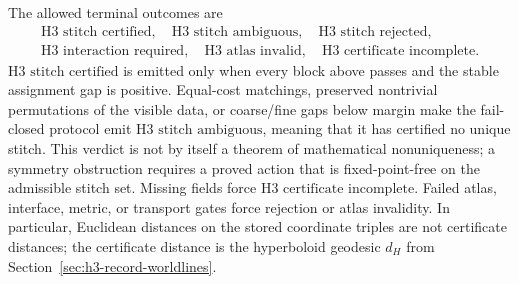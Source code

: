 The allowed terminal outcomes are
\[
\begin{gathered}
\text{H3 stitch certified},\quad
\text{H3 stitch ambiguous},\quad
\text{H3 stitch rejected},\\
\text{H3 interaction required},\quad
\text{H3 atlas invalid},\quad
\text{H3 certificate incomplete}.
\end{gathered}
\]
\(\text{H3 stitch certified}\) is emitted only when every block above passes and the stable
assignment gap is positive. Equal-cost matchings, preserved nontrivial permutations of the visible
data, or coarse/fine gaps below margin make the fail-closed protocol emit
\(\text{H3 stitch ambiguous}\), meaning that it has certified no unique
stitch. This verdict is not by itself a theorem of mathematical nonuniqueness;
a symmetry obstruction requires a proved action that is fixed-point-free on
the admissible stitch set. Missing fields
force \(\text{H3 certificate incomplete}\). Failed atlas, interface, metric, or transport gates
force rejection or atlas invalidity. In particular, Euclidean distances on
the stored coordinate triples are not certificate distances; the certificate distance is
the hyperboloid geodesic \(d_H\) from Section~\ref{sec:h3-record-worldlines}.
